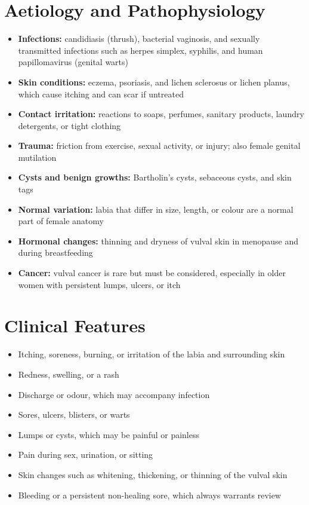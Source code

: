\section*{Aetiology and Pathophysiology}
\begin{itemize}
    \item \textbf{Infections:} candidiasis (thrush), bacterial vaginosis, and sexually transmitted infections such as herpes simplex, syphilis, and human papillomavirus (genital warts)
    \item \textbf{Skin conditions:} eczema, psoriasis, and lichen sclerosus or lichen planus, which cause itching and can scar if untreated
    \item \textbf{Contact irritation:} reactions to soaps, perfumes, sanitary products, laundry detergents, or tight clothing
    \item \textbf{Trauma:} friction from exercise, sexual activity, or injury; also female genital mutilation
    \item \textbf{Cysts and benign growths:} Bartholin's cysts, sebaceous cysts, and skin tags
    \item \textbf{Normal variation:} labia that differ in size, length, or colour are a normal part of female anatomy
    \item \textbf{Hormonal changes:} thinning and dryness of vulval skin in menopause and during breastfeeding
    \item \textbf{Cancer:} vulval cancer is rare but must be considered, especially in older women with persistent lumps, ulcers, or itch
\end{itemize}

\section*{Clinical Features}
\begin{itemize}
    \item Itching, soreness, burning, or irritation of the labia and surrounding skin
    \item Redness, swelling, or a rash
    \item Discharge or odour, which may accompany infection
    \item Sores, ulcers, blisters, or warts
    \item Lumps or cysts, which may be painful or painless
    \item Pain during sex, urination, or sitting
    \item Skin changes such as whitening, thickening, or thinning of the vulval skin
    \item Bleeding or a persistent non-healing sore, which always warrants review
\end{itemize}

